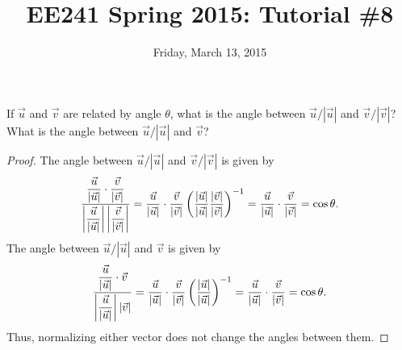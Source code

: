 \documentclass{tutorial}
\begin{document}
\newif\ifsolns

\solnstrue

\title{EE241 Spring 2015: Tutorial \#8}
\date{Friday, March 13, 2015}
\maketitle

\begin{prob}
If $\vec{u}$ and $\vec{v}$ are related by angle $\theta$, what is the angle between $\vec{u} / | \vec{u} |$ and $\vec{v} / |\vec{v}|$? What is the angle between $\vec{u} / |\vec{u}|$ and $\vec{v}$?
\end{prob} \ifsolns \begin{proof}
The angle between $\vec{u} / | \vec{u} |$ and $\vec{v} / |\vec{v}|$ is given by
\[
  \frac{\displaystyle\frac{\vec{u}}{|\vec{u}|} \cdot \displaystyle\frac{\vec{v}}{|\vec{v}|}}
  {\left| \displaystyle\frac{\vec{u}}{|\vec{u}|} \right| \left|\displaystyle\frac{\vec{v}}{|\vec{v}|} \right|}
  = 
  \frac{\vec{u}}{|\vec{u}|} \cdot \frac{\vec{v}}{|\vec{v}|}
  \left( \frac{|\vec{u}|}{|\vec{u}|} \frac{|\vec{v}|}{|\vec{v}|} \right)^{-1}
  =
  \frac{\vec{u}}{|\vec{u}|} \cdot \frac{\vec{v}}{|\vec{v}|}
  = \cos \theta .
\]
The angle between $\vec{u} / |\vec{u}|$ and $\vec{v}$ is given by
\[
  \frac{\displaystyle\frac{\vec{u}}{|\vec{u}|} \cdot \vec{v}}
  {\left| \displaystyle\frac{\vec{u}}{|\vec{u}|} \right| \left| \vec{v} \right|}
  = 
  \frac{\vec{u}}{|\vec{u}|} \cdot \frac{\vec{v}}{|\vec{v}|}
  \left( \frac{|\vec{u}|}{|\vec{u}|} \right)^{-1}
  =
  \frac{\vec{u}}{|\vec{u}|} \cdot \frac{\vec{v}}{|\vec{v}|}
  = \cos \theta .
\]
Thus, normalizing either vector does not change the angles between them.
\end{proof}\else \vspace{3in} \fi
\end{document}
